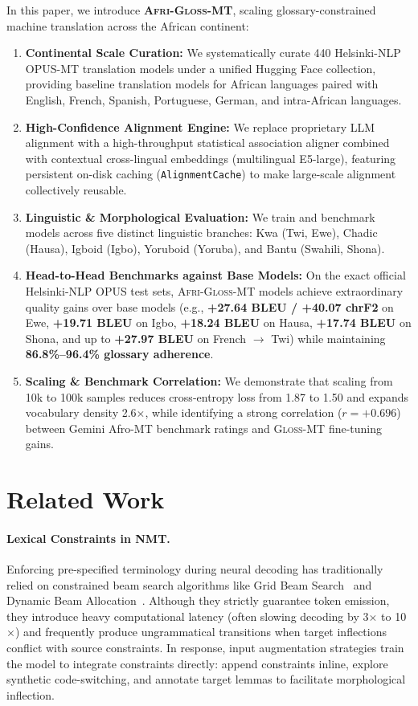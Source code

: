 \documentclass[10pt,twocolumn]{article}
\newcommand{\gm}{\textsc{Gloss-MT}}
\newcommand{\agm}{\textsc{Afri-Gloss-MT}}
\begin{document}
In this paper, we introduce \textbf{\agm{}}, scaling glossary-constrained machine translation across the African continent:
\begin{enumerate}
    \item \textbf{Continental Scale Curation:} We systematically curate 440 Helsinki-NLP OPUS-MT translation models under a unified Hugging Face collection, providing baseline translation models for African languages paired with English, French, Spanish, Portuguese, German, and intra-African languages.
    \item \textbf{High-Confidence Alignment Engine:} We replace proprietary LLM alignment with a high-throughput statistical association aligner combined with contextual cross-lingual embeddings (multilingual E5-large), featuring persistent on-disk caching (\texttt{AlignmentCache}) to make large-scale alignment collectively reusable.
    \item \textbf{Linguistic \& Morphological Evaluation:} We train and benchmark models across five distinct linguistic branches: Kwa (Twi, Ewe), Chadic (Hausa), Igboid (Igbo), Yoruboid (Yoruba), and Bantu (Swahili, Shona).
    \item \textbf{Head-to-Head Benchmarks against Base Models:} On the exact official Helsinki-NLP OPUS test sets, \agm{} models achieve extraordinary quality gains over base models (e.g., \textbf{+27.64 BLEU / +40.07 chrF2} on Ewe, \textbf{+19.71 BLEU} on Igbo, \textbf{+18.24 BLEU} on Hausa, \textbf{+17.74 BLEU} on Shona, and up to \textbf{+27.97 BLEU} on French $\rightarrow$ Twi) while maintaining \textbf{86.8\%--96.4\% glossary adherence}.
    \item \textbf{Scaling & Benchmark Correlation:} We demonstrate that scaling from 10k to 100k samples reduces cross-entropy loss from 1.87 to 1.50 and expands vocabulary density 2.6$\times$, while identifying a strong correlation ($r = +0.696$) between Gemini Afro-MT benchmark ratings and \gm{} fine-tuning gains.
\end{enumerate}

\section{Related Work}

\paragraph{Lexical Constraints in NMT.} Enforcing pre-specified terminology during neural decoding has traditionally relied on constrained beam search algorithms like Grid Beam Search~\cite{hokamp2017lexically} and Dynamic Beam Allocation~\cite{post2018fast}. Although they strictly guarantee token emission, they introduce heavy computational latency (often slowing decoding by 3$\times$ to 10$\times$) and frequently produce ungrammatical transitions when target inflections conflict with source constraints. In response, input augmentation strategies train the model to integrate constraints directly: \citet{dinu2019training} append constraints inline, \citet{song2019code} explore synthetic code-switching, and \citet{bergmanis2021facilitating} annotate target lemmas to facilitate morphological inflection.
\end{document}
